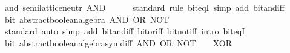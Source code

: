 \begin{isabellebody}
\endisatagproof
{\isafoldproof}%
%
\isadelimproof
\isanewline
%
\endisadelimproof
\isanewline
{}\isamarkupfalse%
\ {\isachardoublequoteopen}and{\isachardoublequoteclose}{\isacharcolon}{\kern0pt}\ semilattice{\isacharunderscore}{\kern0pt}neutr\ {\isacartoucheopen}{\isacharparenleft}{\kern0pt}AND{\isacharparenright}{\kern0pt}{\isacartoucheclose}\ {\isacartoucheopen}{\isacharminus}{\kern0pt}\ {}{\isacartoucheclose}\isanewline
%
\isadelimproof
\ \ %
\endisadelimproof
%
\isatagproof
{}\isamarkupfalse%
\ standard\ {\isacharparenleft}{\kern0pt}rule\ bit{\isacharunderscore}{\kern0pt}eqI{\isacharcomma}{\kern0pt}\ simp\ add{\isacharcolon}{\kern0pt}\ bit{\isacharunderscore}{\kern0pt}and{\isacharunderscore}{\kern0pt}iff{\isacharparenright}{\kern0pt}%
\endisatagproof
{\isafoldproof}%
%
\isadelimproof
\isanewline
%
\endisadelimproof
\isanewline
{}\isamarkupfalse%
\ bit{\isacharcolon}{\kern0pt}\ abstract{\isacharunderscore}{\kern0pt}boolean{\isacharunderscore}{\kern0pt}algebra\ {\isacartoucheopen}{\isacharparenleft}{\kern0pt}AND{\isacharparenright}{\kern0pt}{\isacartoucheclose}\ {\isacartoucheopen}{\isacharparenleft}{\kern0pt}OR{\isacharparenright}{\kern0pt}{\isacartoucheclose}\ NOT\ {}\ {\isacartoucheopen}{\isacharminus}{\kern0pt}\ {}{\isacartoucheclose}\isanewline
%
\isadelimproof
\ \ %
\endisadelimproof
%
\isatagproof
{}\isamarkupfalse%
\ standard\ {\isacharparenleft}{\kern0pt}auto\ simp\ add{\isacharcolon}{\kern0pt}\ bit{\isacharunderscore}{\kern0pt}and{\isacharunderscore}{\kern0pt}iff\ bit{\isacharunderscore}{\kern0pt}or{\isacharunderscore}{\kern0pt}iff\ bit{\isacharunderscore}{\kern0pt}not{\isacharunderscore}{\kern0pt}iff\ intro{\isacharcolon}{\kern0pt}\ bit{\isacharunderscore}{\kern0pt}eqI{\isacharparenright}{\kern0pt}%
\endisatagproof
{\isafoldproof}%
%
\isadelimproof
\isanewline
%
\endisadelimproof
\isanewline
{}\isamarkupfalse%
\ bit{\isacharcolon}{\kern0pt}\ abstract{\isacharunderscore}{\kern0pt}boolean{\isacharunderscore}{\kern0pt}algebra{\isacharunderscore}{\kern0pt}sym{\isacharunderscore}{\kern0pt}diff\ {\isacartoucheopen}{\isacharparenleft}{\kern0pt}AND{\isacharparenright}{\kern0pt}{\isacartoucheclose}\ {\isacartoucheopen}{\isacharparenleft}{\kern0pt}OR{\isacharparenright}{\kern0pt}{\isacartoucheclose}\ NOT\ {}\ {\isacartoucheopen}{\isacharminus}{\kern0pt}\ {}{\isacartoucheclose}\ {\isacartoucheopen}{\isacharparenleft}{\kern0pt}XOR{\isacharparenright}{\kern0pt}{\isacartoucheclose}\isanewline
%
\isadelimproof
\ \ %

\end{isabellebody}
